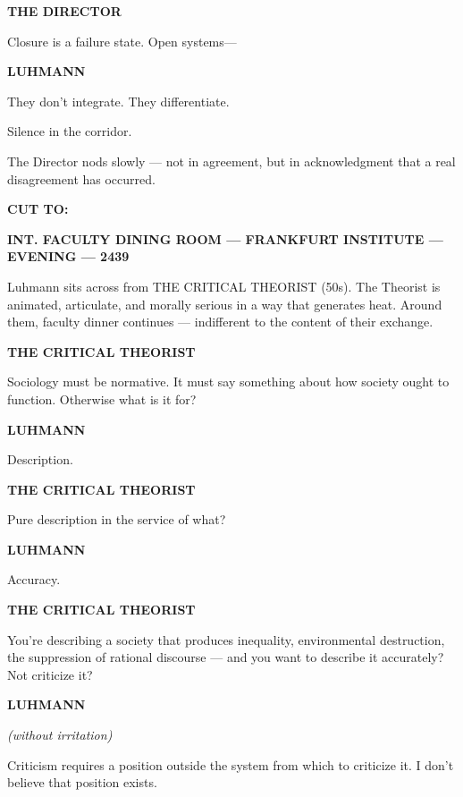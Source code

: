 \documentclass[12pt]{article}
\newcommand{\sceneheading}[1]{%
  \vspace{10pt}%
  \noindent\textbf{#1}%
  \vspace{6pt}%
}
\newcommand{\trans}[1]{%
  \vspace{8pt}%
  \begin{flushright}\textbf{#1}\end{flushright}%
  \vspace{4pt}%
}
\newcommand{\character}[1]{%
  \vspace{8pt}%
  \begin{center}\textbf{#1}\end{center}%
  \vspace{-4pt}%
}
\newcommand{\paren}[1]{%
  \begin{center}\textit{(#1)}\end{center}%
  \vspace{-4pt}%
}
\newenvironment{dialogue}{%
  \begin{center}%
  \begin{minipage}{0.62\textwidth}%
}{%
  \end{minipage}%
  \end{center}%
  \vspace{4pt}%
}
\newenvironment{action}{%
  \vspace{4pt}%
  \noindent\ignorespaces%
}{%
  \vspace{6pt}%
}
\begin{document}
\character{THE DIRECTOR}
\begin{dialogue}
Closure is a failure state. Open systems—
\end{dialogue}

\character{LUHMANN}
\begin{dialogue}
They don't integrate. They differentiate.
\end{dialogue}

\begin{action}
Silence in the corridor.

The Director nods slowly — not in agreement, but in acknowledgment that a real disagreement has occurred.
\end{action}

\trans{CUT TO:}

\sceneheading{INT. FACULTY DINING ROOM — FRANKFURT INSTITUTE — EVENING — 2439}

\begin{action}
Luhmann sits across from THE CRITICAL THEORIST (50s). The Theorist is animated, articulate, and morally serious in a way that generates heat. Around them, faculty dinner continues — indifferent to the content of their exchange.
\end{action}

\character{THE CRITICAL THEORIST}
\begin{dialogue}
Sociology must be normative. It must say something about how society ought to function. Otherwise what is it for?
\end{dialogue}

\character{LUHMANN}
\begin{dialogue}
Description.
\end{dialogue}

\character{THE CRITICAL THEORIST}
\begin{dialogue}
Pure description in the service of what?
\end{dialogue}

\character{LUHMANN}
\begin{dialogue}
Accuracy.
\end{dialogue}

\character{THE CRITICAL THEORIST}
\begin{dialogue}
You're describing a society that produces inequality, environmental destruction, the suppression of rational discourse — and you want to describe it accurately? Not criticize it?
\end{dialogue}

\character{LUHMANN}
\paren{without irritation}
\begin{dialogue}
Criticism requires a position outside the system from which to criticize it. I don't believe that position exists.
\end{dialogue}
\end{document}
